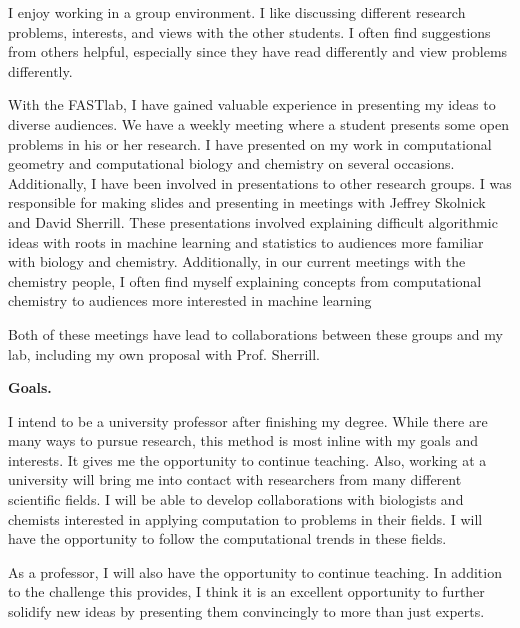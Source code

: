 \documentclass[twoside,leqno, 12pt]{article}
\begin{document}
I enjoy working in a group environment.  I like discussing different research problems, interests, and views with the other students.  I often find suggestions from others helpful, especially since they have read differently and view problems differently.  

With the FASTlab, I have gained valuable experience in presenting my ideas to diverse audiences.  We have a weekly meeting where a student presents some open problems in his or her research.  I have presented on my work in computational geometry and computational biology and chemistry on several occasions.  Additionally, I have been involved in presentations to other research groups.  I was responsible for making slides and presenting in meetings with Jeffrey Skolnick and David Sherrill.  These presentations involved explaining difficult algorithmic ideas with roots in machine learning and statistics to audiences more familiar with biology and chemistry.  Additionally, in our current meetings with the chemistry people, I often find myself explaining concepts from computational chemistry to audiences more interested in machine learning


Both of these meetings have lead to collaborations between these groups and my lab, including my own proposal with Prof. Sherrill. 



\textbf{Goals.}

I intend to be a university professor after finishing my degree.  While there are many ways to pursue research, this method is most inline with my goals and interests.  It gives me the opportunity to continue teaching.  Also, working at a university will bring me into contact with researchers from many different scientific fields.  I will be able to develop collaborations with biologists and chemists interested in applying computation to problems in their fields.  I will have the opportunity to follow the computational trends in these fields.  

As a professor, I will also have the opportunity to continue teaching.  In addition to the challenge this provides, I think it is an excellent opportunity to further solidify new ideas by presenting them convincingly to more than just experts.  
\end{document}
